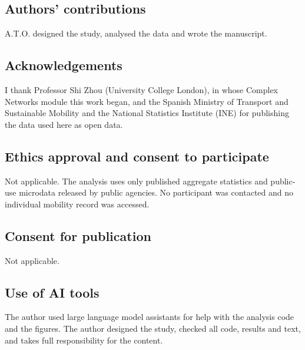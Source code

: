 \documentclass[pdflatex,sn-mathphys-num,referee]{sn-jnl}
\begin{document}
\subsection*{Authors' contributions}
A.T.O. designed the study, analysed the data and wrote the manuscript.

\subsection*{Acknowledgements}
I thank Professor Shi Zhou (University College London), in whose Complex Networks module this work began, and the Spanish Ministry of Transport and Sustainable Mobility and the National Statistics Institute (INE) for publishing the data used here as open data.

\subsection*{Ethics approval and consent to participate}
Not applicable. The analysis uses only published aggregate statistics and public-use microdata released by public agencies. No participant was contacted and no individual mobility record was accessed.

\subsection*{Consent for publication}
Not applicable.

\subsection*{Use of AI tools}
The author used large language model assistants for help with the analysis code and the figures. The author designed the study, checked all code, results and text, and takes full responsibility for the content.


\end{document}
